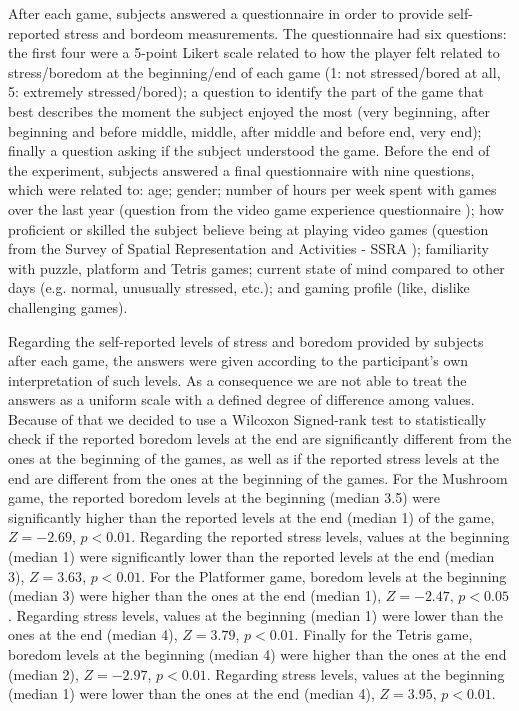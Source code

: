 After each game, subjects answered a questionnaire in order to provide self-reported stress and bordeom measurements. The questionnaire had six questions: the first four were a 5-point Likert scale related to how the player felt related to stress/boredom at the beginning/end of each game (1: not stressed/bored at all, 5: extremely stressed/bored); a question to identify the part of the game that best describes the moment the subject enjoyed the most (very beginning, after beginning and before middle, middle, after middle and before end, very end); finally a question asking if the subject understood the game. Before the end of the experiment, subjects answered a final questionnaire with nine questions, which were related to: age; gender; number of hours per week spent with games over the last year (question from the video game experience questionnaire \parencite{unsworth2015playing}); how proficient or skilled the subject believe being at playing video games (question from the Survey of Spatial Representation and Activities - SSRA \parencite{terlecki2005important}); familiarity with puzzle, platform and Tetris games; current state of mind compared to other days (e.g. normal, unusually stressed, etc.); and gaming profile (like, dislike challenging games).

Regarding the self-reported levels of stress and boredom provided by subjects after each game, the answers were given according to the participant's own interpretation of such levels. As a consequence we are not able to treat the answers as a uniform scale with a defined degree of difference among values. Because of that we decided to use a Wilcoxon Signed-rank test to statistically check if the reported boredom levels at the end are significantly different from the ones at the beginning of the games, as well as if the reported stress levels at the end are different from the ones at the beginning of the games. For the Mushroom game, the reported boredom levels at the beginning (median 3.5) were significantly higher than the reported levels at the end (median 1) of the game, $Z=-2.69$, $p<0.01$. Regarding the reported stress levels, values at the beginning (median 1) were significantly lower than the reported levels at the end (median 3), $Z=3.63$, $p<0.01$. For the Platformer game, boredom levels at the beginning (median 3) were higher than the ones at the end (median 1), $Z=-2.47$, $p<0.05$. Regarding stress levels, values at the beginning (median 1) were lower than the ones at the end (median 4), $Z=3.79$, $p<0.01$. Finally for the Tetris game, boredom levels at the beginning (median 4) were higher than the ones at the end (median 2), $Z=-2.97$, $p<0.01$. Regarding stress levels, values at the beginning (median 1) were lower than the ones at the end (median 4), $Z=3.95$, $p<0.01$.


